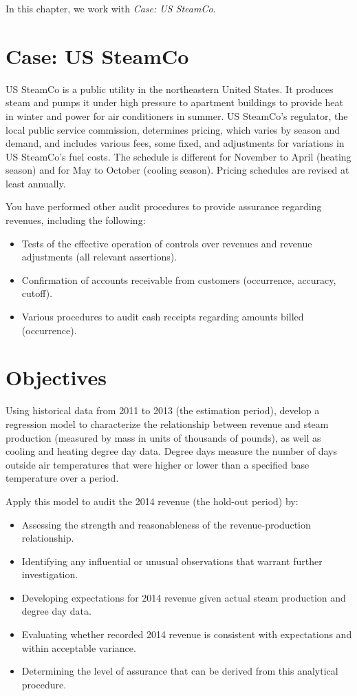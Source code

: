 \bigskip
In this chapter, we work with \textit{Case: US SteamCo}.

\begin{mdframed}[hidealllines=true,backgroundcolor=KPMG_blue!20]
\section*{Case: US SteamCo}
\label{case:ussteamco_ch07}

US SteamCo is a public utility in the northeastern United States. It produces steam and pumps it under high pressure to apartment buildings to provide heat in winter and power for air conditioners in summer. US SteamCo's regulator, the local public service commission, determines pricing, which varies by season and demand, and includes various fees, some fixed, and adjustments for variations in US SteamCo's fuel costs. The schedule is different for November to April (heating season) and for May to October (cooling season). Pricing schedules are revised at least annually.

\bigskip
You have performed other audit procedures to provide assurance regarding revenues, including the following:

\begin{itemize}
\item Tests of the effective operation of controls over revenues and revenue adjustments (all relevant assertions).
\item Confirmation of accounts receivable from customers (occurrence, accuracy, cutoff).
\item Various procedures to audit cash receipts regarding amounts billed (occurrence).
\end{itemize}

\section*{Objectives}

Using historical data from 2011 to 2013 (the estimation period), develop a regression model to characterize the relationship between revenue and steam production (measured by mass in units of thousands of pounds), as well as cooling and heating degree day data. Degree days measure the number of days outside air temperatures that were higher or lower than a specified base temperature over a period.

Apply this model to audit the 2014 revenue (the hold-out period) by:
\begin{itemize}
\item Assessing the strength and reasonableness of the revenue-production relationship.
\item Identifying any influential or unusual observations that warrant further investigation.
\item Developing expectations for 2014 revenue given actual steam production and degree day data.
\item Evaluating whether recorded 2014 revenue is consistent with expectations and within acceptable variance.
\item Determining the level of assurance that can be derived from this analytical procedure.
\end{itemize}


\end{mdframed}
